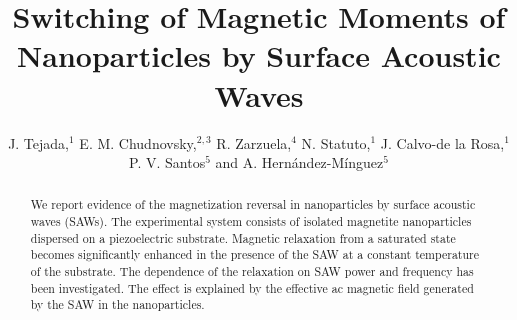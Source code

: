 \documentclass[aps,prb,floats,twocolumn]{revtex4}
\begin{document}
\title{Switching of Magnetic Moments of Nanoparticles by Surface Acoustic Waves}

\author{J. Tejada,$^{1}$ E. M. Chudnovsky,$^{2,3}$ R. Zarzuela,$^{4}$ N. Statuto,$^{1}$ J. Calvo-de la Rosa,$^{1}$ P. V. Santos$^{5}$ and A. Hern\'{a}ndez-M\'{i}nguez$^{5}$}



\begin{abstract}
We report evidence of the magnetization reversal in nanoparticles by surface acoustic waves (SAWs). The experimental system consists of isolated magnetite nanoparticles dispersed on a piezoelectric substrate. Magnetic relaxation from a saturated state becomes significantly enhanced in the presence of the SAW at a constant temperature of the substrate. The dependence of the relaxation on SAW power and frequency has been investigated. The effect is explained by the effective ac magnetic field generated by the SAW in the nanoparticles.
\end{abstract}


\maketitle
\end{document}
